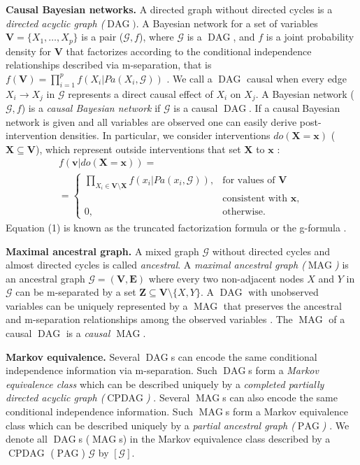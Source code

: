 \documentclass[]{article}
\DeclareMathOperator{\CPDAG}{CPDAG}
\DeclareMathOperator{\DAG}{DAG}
\DeclareMathOperator{\MAG}{MAG}
\DeclareMathOperator{\PAG}{PAG}
\theoremstyle{definition}
\theoremstyle{remark}
\newcommand{\vars}[1][V]{\mathbf{#1}}
\newcommand{\e}[1][E]{\mathbf{#1}}
\newcommand{\g}[1][G]{\mathcal{#1}}
\begin{document}
\textbf{Causal Bayesian networks.} A directed graph without directed cycles is a \emph{directed acyclic graph ($\DAG)$}. A Bayesian network for a set of variables $\vars=\{X_{1},\dots,X_{p}\}$ is a pair ($\g,f$), where $\g$ is a $\DAG$, and $f$ is a joint probability density for $\vars$ that factorizes according to the conditional independence relationships described via m-separation, that is $f(\vars)= \prod_{i=1}^{p}f(X_{i}|Pa(X_{i},\g))$ \citep{Pearl2009}. We call a $\DAG$ causal when every edge $X_{i} \rightarrow X_{j}$ in $\g$ represents a direct causal effect of $X_{i}$ on $X_{j}$. A Bayesian network ($\g,f$) is a \emph{causal Bayesian network} if $\g$ is a causal $\DAG$. If a causal Bayesian network is given and all variables are observed one can easily derive post-intervention densities. In particular, we consider interventions $do(\mathbf{X} =\mathbf{x})$ ($\mathbf{X}\subseteq \mathbf{V}$), which represent outside interventions that set $\mathbf{X}$ to $\mathbf{x}$ \citep{Pearl2009}:
\begin{multline}
f(\mathbf{v}|do(\mathbf{X}=\mathbf{x})) =   \\
=
\begin{cases}
\prod_{X_{i} \in \vars \setminus \mathbf{X}}f(x_{i}|Pa(x_{i},\g)), &  \text{for values of }\mathbf{V} \\ & \text{consistent with }\mathbf{x,} \\
0, & \text{otherwise.}
\end{cases}
\end{multline}
Equation (1) is known as the truncated factorization formula \citep{Pearl2009} or the g-formula \citep{robins1986new}.

\textbf{Maximal ancestral graph.}
A mixed graph $\g$ without directed cycles and almost directed cycles is called \textit{ancestral}. A \emph{maximal ancestral graph ($\MAG$)} is an ancestral graph $\g = (\vars, \e)$ where every two non-adjacent nodes $X$ and $Y$ in $\g$ can be m-separated by a set $\mathbf{Z} \subseteq \vars \setminus \{X,Y\}$. A $\DAG$ with unobserved variables can be uniquely represented by a $\MAG$ that preserves the ancestral and m-separation relationships among the observed variables \citep{richardson2002ancestral}.
The $\MAG$ of a causal $\DAG$ is a \emph{causal $\MAG$}.

\textbf{Markov equivalence.}
 Several $\DAG$s can encode the same conditional independence information via m-separation. Such $\DAG$s form a \emph{Markov equivalence class} which can be described uniquely by a \emph{completed partially directed acyclic graph ($\CPDAG$)} .
 Several $\MAG$s can also encode the same conditional independence information. Such $\MAG$s form a Markov equivalence class which can be described uniquely by a \emph{partial ancestral graph ($\PAG$)} \citep{richardson2002ancestral, ali2009markov}.
We denote all $\DAG$s ($\MAG$s) in the Markov equivalence class described by a $\CPDAG$ ($\PAG$) $\g$ by $[\g]$.
\end{document}
